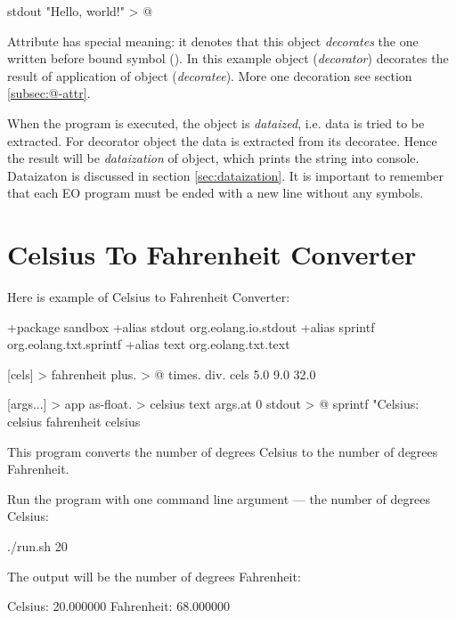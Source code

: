 \documentclass[12pt]{book}
\begin{document}
\begin{ffcode}
stdout "Hello, world!\n" > @
\end{ffcode}
Attribute  has special meaning: it denotes that this object \textit{decorates} the one written before bound symbol (\ff{>}). In this example object  (\textit{decorator}) decorates the result of application of object  (\textit{decoratee}). More one decoration see section \ref{subsec:@-attr}.

When the program is executed, the  object is \textit{dataized}, i.e. data is tried to be extracted. For decorator object the data is extracted from its decoratee. Hence the result will be \textit{dataization} of  object, which prints the string into console. Dataizaton is discussed in section \ref{sec:dataization}. It is important to remember that each EO program must be ended with a new line without any symbols.

\section{Celsius To Fahrenheit Converter}

Here is example of Celsius to Fahrenheit Converter:

\begin{ffcode}
+package sandbox
+alias stdout org.eolang.io.stdout
+alias sprintf org.eolang.txt.sprintf
+alias text org.eolang.txt.text

[cels] > fahrenheit
  plus. > @
    times.
      div.
        cels
        5.0
      9.0
    32.0

[args...] > app
  as-float. > celsius
    text
      args.at 0
  stdout > @
    sprintf
      "Celsius: %
      celsius
      fahrenheit celsius
\end{ffcode}

This program converts the number of degrees Celsius to the number of degrees Fahrenheit.

Run the program with one command line argument —  the number of degrees Celsius:
\begin{ffcode}
./run.sh 20
\end{ffcode}
The output will be the number of degrees Fahrenheit:
\begin{ffcode}
Celsius: 20.000000
Fahrenheit: 68.000000
\end{ffcode}
\end{document}

